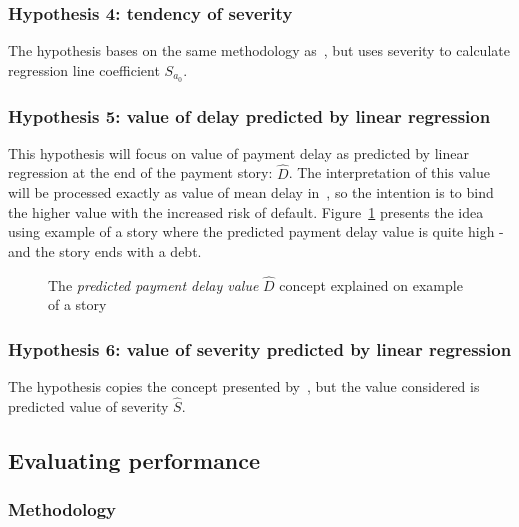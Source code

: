 \documentclass{article}
\begin{document}
\subsubsection{Hypothesis 4: tendency of severity}

The hypothesis bases on the same methodology as\ , but uses severity to calculate regression line coefficient $S_{a_0}$.

\subsubsection{Hypothesis 5: value of delay predicted by linear regression}
\label{section:H5}

This hypothesis will focus on value of payment delay as predicted by linear regression at the end of the payment story: $\hat{D}$.
The interpretation of this value will be processed exactly as value of mean delay in\ ,
so the intention is to bind the higher value with the increased risk of default.
Figure\ \ref{fig:304_h5_tendency_value_explained} presents the idea using example of a story where the predicted payment delay value is quite high - and the story ends with a debt.

\begin{figure}[htbp!]
    \begin{center}
        
    \caption{The \textit{predicted payment delay value} $\hat{D}$ concept explained on example of a story}
    \label{fig:304_h5_tendency_value_explained}
    \end{center}
\end{figure}


\subsubsection{Hypothesis 6: value of severity predicted by linear regression}

The hypothesis copies the concept presented by\ , but the value considered is predicted value of severity $\hat{S}$.

\subsection{Evaluating performance}

\subsubsection{Methodology}
\end{document}
